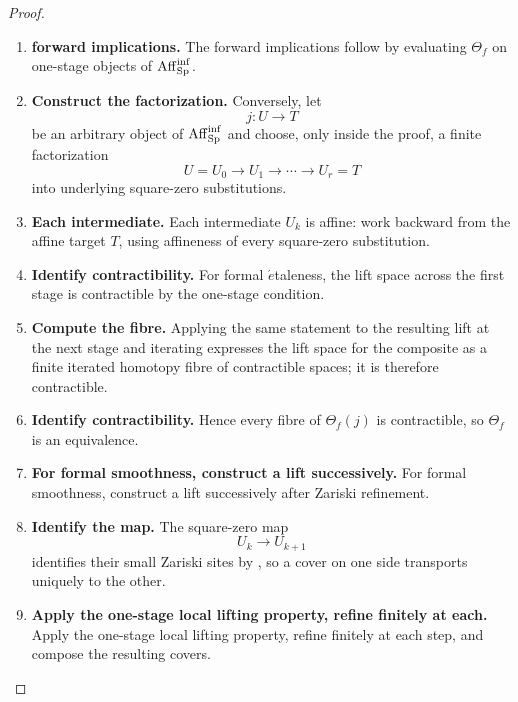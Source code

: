 \begin{proof}
\leavevmode
\begin{enumerate}[label=\textup{(\arabic*)}]
    \item \textbf{forward implications.}
    The forward implications follow by evaluating \(\Theta_f\) on one-stage objects of
    \(\operatorname{Aff}_{\operatorname{Sp}}^{\inf}\).

    \item \textbf{Construct the factorization.}
    Conversely, let
    \[
        j:U\longrightarrow T
    \]
    be an arbitrary object of \(\operatorname{Aff}_{\operatorname{Sp}}^{\inf}\) and choose, only inside the proof, a finite
    factorization
    \[
        U=U_0
        \longrightarrow
        U_1
        \longrightarrow
        \cdots
        \longrightarrow
        U_r=T
    \]
    into underlying square-zero substitutions.

    \item \textbf{Each intermediate.}
    Each intermediate \(U_k\) is affine: work backward from the affine target \(T\),
    using affineness of every square-zero substitution.

    \item \textbf{Identify contractibility.}
    For formal \(\acute{e}\)taleness, the lift space across the first stage is contractible by the
    one-stage condition.

    \item \textbf{Compute the fibre.}
    Applying the same statement to the resulting lift at the next stage and iterating expresses
    the lift space for the composite as a finite iterated homotopy fibre of contractible spaces;
    it is therefore contractible.

    \item \textbf{Identify contractibility.}
    Hence every fibre of \(\Theta_f(j)\) is contractible, so \(\Theta_f\) is an equivalence.

    \item \textbf{For formal smoothness, construct a lift successively.}
    For formal smoothness, construct a lift successively after Zariski refinement.

    \item \textbf{Identify the map.}
    The square-zero map
    \[
        U_k\longrightarrow U_{k+1}
    \]
    identifies their small Zariski sites by , so a
    cover on one side transports uniquely to the other.

    \item \textbf{Apply the one-stage local lifting property, refine finitely at each.}
    Apply the one-stage local lifting property, refine finitely at each step, and compose the
    resulting covers.


\end{enumerate}
\end{proof}
